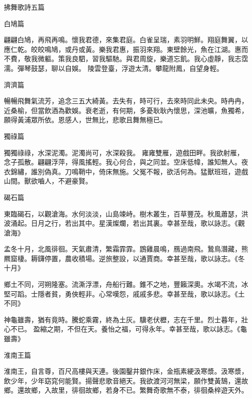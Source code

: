 \begin{pinyinscope}
 拂舞歌詩五篇



 白鳩篇



 翩翩白鳩，再飛再鳴。懷我君德，來集君庭。白雀呈瑞，素羽明鮮。翔庭舞翼，以應仁乾。皎皎鳴鳩，或丹或黃。樂我君惠，振羽來翔。東壁餘光，魚在江湖。惠而不費，敬我微軀。策我良駟，習我驅馳。與君周旋，樂道忘飢。我心虛靜，我志霑濡。彈琴鼓瑟，聊以自娛。
 陵雲登臺，浮遊太清。攀龍附鳳，自望身輕。



 濟濟篇



 暢暢飛舞氣流芳，追念三五大綺黃。去失有，時可行，去來時同此未央。時冉冉，近桑榆，但當飲酒為歡娛。衰老逝，有何期，多憂耿耿內懷思，深池曠，魚獨希，願得黃浦眾所依。恩感人，世無比，悲歌且舞無極已。



 獨祿篇



 獨獨祿祿，水深泥濁。泥濁尚可，水深殺我。
 雍雍雙雁，遊戲田畔。我欲射雁，念子孤散。翩翩浮萍，得風搖輕。我心何合，與之同並。空床低幃，誰知無人。夜衣錦繡，誰別偽真。刀鳴鞘中，倚床無施。父冤不報，欲活何為。猛獸班班，遊戲山間。獸欲嚙人，不避豪賢。



 碣石篇



 東臨碣石，以觀滄海。水何淡淡，山島竦峙。樹木叢生，百草豐茂。秋風蕭瑟，洪波涌起。日月之行，若出其中。星漢燦爛，若出其裏。幸甚至哉，歌以詠志。《觀滄海》



 孟冬十月，北風徘徊。天氣肅清，繁霜霏霏。鵾雞晨鳴，鴈過南飛。鷙鳥潛藏，熊羆窟棲。耨鑮停置，農收積場。逆旅整設，以通賈商。幸甚至哉，歌以詠志。《冬十月》



 鄉土不同，河朔隆塞。流澌浮漂，舟船行難。錐不之地，豐籟深奧。水竭不流，冰堅可蹈。士隱者貧，勇俠輕非。心常嘆怨，戚戚多悲。幸甚至哉，歌以詠志。《土不同》



 神龜雖壽，猶有竟時。騰蛇乘霧，終為土灰。驥老伏櫪，志在千里。烈士暮年，壯心不已。
 盈縮之期，不但在天。養怡之福，可得永年。幸甚至哉，歌以詠志。《龜雖壽》



 淮南王篇



 淮南王，自言尊，百尺高樓與天連。後園鑿井銀作床，金瓶素綆汲寒漿。汲寒漿，飲少年，少年窈窕何能賢。揚聲悲歌音絕天。我欲渡河河無梁，願作雙黃鵠，還故鄉。還故鄉，入故里，徘徊故鄉，若身不已。繁舞奇歌無不泰，徘徊桑梓遊天外。




\end{pinyinscope}
